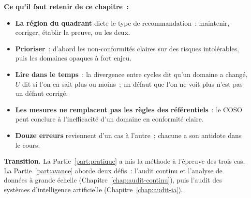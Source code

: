 
\separateur

\begin{boxresume}
\textbf{Ce qu'il faut retenir de ce chapitre~:}
\begin{itemize}
    \item \textbf{La région du quadrant} dicte le type de recommandation~:
          maintenir, corriger, établir la preuve, ou les deux.
    \item \textbf{Prioriser}~: d'abord les non-conformités claires sur des
          risques intolérables, puis les domaines opaques à fort enjeu.
    \item \textbf{Lire dans le temps}~: la divergence entre cycles dit qu'un
          domaine a changé, $U$ dit si l'on en sait plus ou moins~; un
          défaut que l'on ne voit plus n'est pas un défaut corrigé.
    \item \textbf{Les mesures ne remplacent pas les règles des
          référentiels}~: le COSO peut conclure à l'inefficacité d'un
          domaine en conformité claire.
    \item \textbf{Douze erreurs} reviennent d'un cas à l'autre~; chacune a
          son antidote dans le cours.
\end{itemize}
\end{boxresume}

\bigskip

\begin{boxinfo}
\textbf{Transition.} La Partie~\ref{part:pratique} a mis la méthode à
l'épreuve des trois cas. La Partie~\ref{part:avance} aborde deux défis~:
l'audit continu et l'analyse de données à grande échelle
(Chapitre~\ref{chap:audit-continu}), puis l'audit des systèmes
d'intelligence artificielle (Chapitre~\ref{chap:audit-ia}).
\end{boxinfo}
